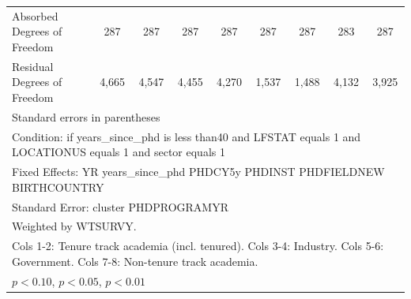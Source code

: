 \begin{table}[htbp]
\begin{tabular}{l*{8}{c}}
Absorbed Degrees of Freedom&         287         &         287         &         287         &         287         &         287         &         287         &         283         &         287         \\
Residual Degrees of Freedom&       4,665         &       4,547         &       4,455         &       4,270         &       1,537         &       1,488         &       4,132         &       3,925         \\
\hline\hline
\multicolumn{9}{l}{\footnotesize Standard errors in parentheses}\\
\multicolumn{9}{l}{\footnotesize Condition: if years\_since\_phd is less than40 and LFSTAT equals 1 and LOCATIONUS equals 1 and sector equals 1}\\
\multicolumn{9}{l}{\footnotesize Fixed Effects: YR years\_since\_phd PHDCY5y PHDINST PHDFIELDNEW BIRTHCOUNTRY}\\
\multicolumn{9}{l}{\footnotesize Standard Error: cluster PHDPROGRAMYR}\\
\multicolumn{9}{l}{\footnotesize Weighted by WTSURVY.}\\
\multicolumn{9}{l}{\footnotesize Cols 1-2: Tenure track academia (incl. tenured). Cols 3-4: Industry. Cols 5-6: Government. Cols 7-8: Non-tenure track academia.}\\
\multicolumn{9}{l}{\footnotesize \sym{*} \(p<0.10\), \sym{**} \(p<0.05\), \sym{***} \(p<0.01\)}\\
\end{tabular}
\end{table}
